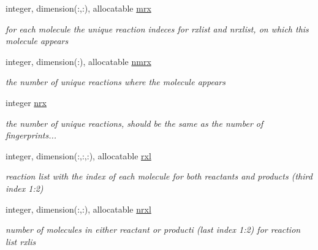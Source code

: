 \begin{DoxyCompactItemize}
integer, dimension(\+:,\+:), allocatable \mbox{\hyperlink{structglobaldata_1_1moldata_a05519eb77473e7481f2c032f653b35f1}{mrx}}
\begin{DoxyCompactList}\small\item\em for each molecule the unique reaction indeces for rxlist and nrxlist, on which this molecule appears \end{DoxyCompactList}\item 
\mbox{\label{structglobaldata_1_1moldata_a99279f0c673f74130cad6faf2801fbab}} 
integer, dimension(\+:), allocatable \mbox{\hyperlink{structglobaldata_1_1moldata_a99279f0c673f74130cad6faf2801fbab}{nmrx}}
\begin{DoxyCompactList}\small\item\em the number of unique reactions where the molecule appears \end{DoxyCompactList}\item 
\mbox{\label{structglobaldata_1_1moldata_a1f250a471c75094e1eb7e1bfa9ce99e8}} 
integer \mbox{\hyperlink{structglobaldata_1_1moldata_a1f250a471c75094e1eb7e1bfa9ce99e8}{nrx}}
\begin{DoxyCompactList}\small\item\em the number of unique reactions, should be the same as the number of fingerprints... \end{DoxyCompactList}\item 
\mbox{\label{structglobaldata_1_1moldata_a5773e6fcfb5153c31316d8cd099fa1e8}} 
integer, dimension(\+:,\+:,\+:), allocatable \mbox{\hyperlink{structglobaldata_1_1moldata_a5773e6fcfb5153c31316d8cd099fa1e8}{rxl}}
\begin{DoxyCompactList}\small\item\em reaction list with the index of each molecule for both reactants and products (third index 1\+:2) \end{DoxyCompactList}\item 
\mbox{\label{structglobaldata_1_1moldata_aec9e760ee30c2784a46999df97a0bab2}} 
integer, dimension(\+:,\+:), allocatable \mbox{\hyperlink{structglobaldata_1_1moldata_aec9e760ee30c2784a46999df97a0bab2}{nrxl}}
\begin{DoxyCompactList}\small\item\em number of molecules in either reactant or producti (last index 1\+:2) for reaction list rxlis \end{DoxyCompactList}\item 

\end{DoxyCompactItemize}
